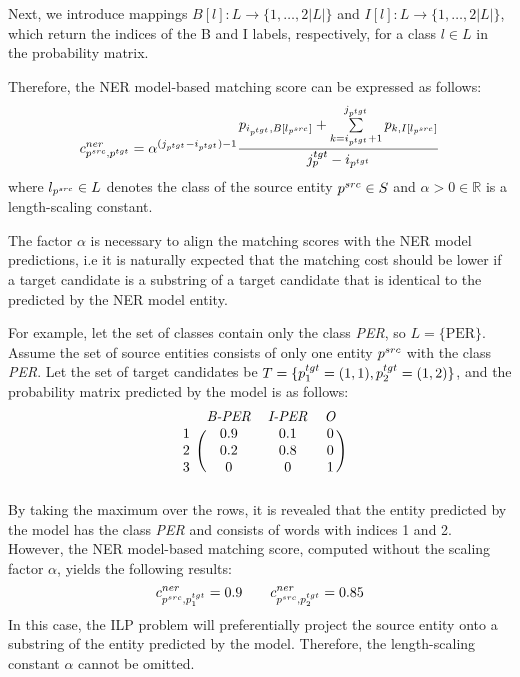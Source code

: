 Next, we introduce mappings \( B[l]: L \rightarrow \{ 1, \dots, 2|L| \} \) and
\( I[l]: L \rightarrow \{ 1, \dots, 2|L| \} \), which return the indices of the
B and I labels, respectively, for a class \( l \in L \) in the probability matrix.

Therefore, the NER model-based matching score can be expressed as follows:
\begin{equation} \label{eq:ner_cost}
  c_{p^{src}, p^{tgt}}^{ner} = \alpha^{(j_{p^{tgt}} - i_{p^{tgt}}) - 1}
  \frac{
    p_{i_{p^{tgt}}, B[l_{p^{src}}]} +
    \sum\limits_{k = i_{p^{tgt}} + 1}^{j_{p^{tgt}}} p_{k, I[l_{p^{src}}]}
  }
  {j_p^{tgt} - i_{p^{tgt}}}
\end{equation}
where \( l_{p^{src}} \in L \) denotes the class of the source entity
\( p^{src} \in S \) and \( \alpha > 0 \in \mathbb{R} \) is a length-scaling constant.

The factor \( \alpha \) is necessary to align the matching scores with the NER model
predictions, i.e it is naturally expected that the matching cost should be lower if a
target candidate is a substring of a target candidate that is identical to the predicted
by the NER model entity.

For example, let the set of classes contain only the class \textit{PER},
so \( L = \{ \text{PER} \} \). Assume the set of source entities consists of
only one entity \( p^{src} \) with the class \textit{PER}. Let the set of target
candidates be \( T = \{ p_1^{tgt} = (1, 1), p_2^{tgt} = (1, 2) \} \), and the
probability matrix predicted by the model is as follows:
\[
  \begin{blockarray}{cccc}
    & \text{\textit{B-PER}} & \text{\textit{I-PER}} & \text{\textit{O}} \\
    \begin{block}{c(ccc)}
      1 & 0.9 & 0.1 & 0 \\
      2 & 0.2 & 0.8 & 0 \\
      3 & 0   & 0   & 1 \\
    \end{block}
  \end{blockarray}
\]
By taking the maximum over the rows, it is revealed that the entity predicted by
the model has the class \textit{PER} and consists of words with indices 1 and 2.
However, the NER model-based matching score, computed without the scaling factor
\( \alpha \), yields the following results:
\[
  c_{p^{src}, p_1^{tgt}}^{ner} = 0.9 \qquad c_{p^{src}, p_2^{tgt}}^{ner} = 0.85
\]
In this case, the ILP problem will preferentially project the source entity onto a
substring of the entity predicted by the model. Therefore, the length-scaling
constant \( \alpha \) cannot be omitted.

